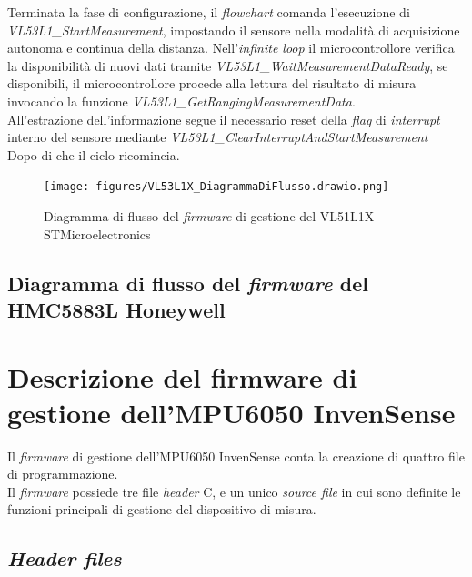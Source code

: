 \documentclass[11pt]{report}
\begin{document}
Terminata la fase di configurazione, il \textit{flowchart} comanda l'esecuzione di\\\textit{VL53L1\_StartMeasurement}, impostando il sensore nella modalità di acquisizione autonoma e continua della distanza.
Nell'\textit{infinite loop} il microcontrollore verifica la disponibilità di nuovi dati tramite \textit{VL53L1\_WaitMeasurementDataReady}, se disponibili, il microcontrollore procede alla lettura del risultato di misura invocando la funzione \textit{VL53L1\_GetRangingMeasurementData}.\\
All'estrazione dell'informazione segue il necessario reset della \textit{flag} di \textit{interrupt} interno del sensore mediante \textit{VL53L1\_ClearInterruptAndStartMeasurement}\\
Dopo di che il ciclo ricomincia.


\begin{figure}[H]
    \centering
    \texttt{[image: figures/VL53L1X\_DiagrammaDiFlusso.drawio.png]}
    \caption{Diagramma di flusso del \textit{firmware} di gestione del VL51L1X STMicroelectronics}
    \label{fig:diagramma 2.2}
\end{figure}

\subsection{Diagramma di flusso del \textit{firmware} del HMC5883L Honeywell}

\newpage

\section{Descrizione del firmware di gestione dell'MPU6050 InvenSense}
Il \textit{firmware} di gestione dell'MPU6050 InvenSense conta la creazione di quattro file di programmazione.\\
Il \textit{firmware} possiede tre file \textit{header} C, e un unico \textit{source file} in cui sono definite le funzioni principali di gestione del dispositivo di misura.
\subsection{\textit{Header files}}
\end{document}
